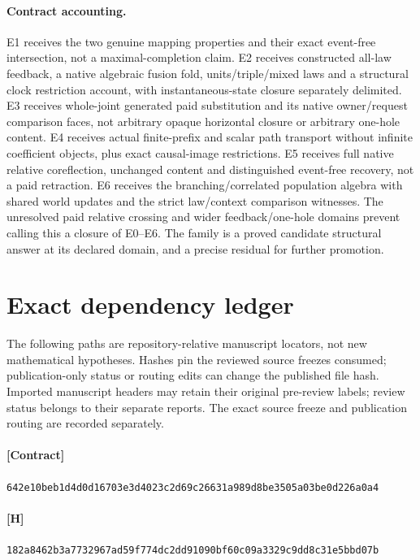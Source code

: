 \documentclass[11pt]{article}
\begin{document}
\paragraph{Contract accounting.} E1 receives the two genuine mapping properties and their exact event-free intersection, not a maximal-completion claim. E2 receives constructed all-law feedback, a native algebraic fusion fold, units/triple/mixed laws and a structural clock restriction account, with instantaneous-state closure separately delimited. E3 receives whole-joint generated paid substitution and its native owner/request comparison faces, not arbitrary opaque horizontal closure or arbitrary one-hole content. E4 receives actual finite-prefix and scalar path transport without infinite coefficient objects, plus exact causal-image restrictions. E5 receives full native relative coreflection, unchanged content and distinguished event-free recovery, not a paid retraction. E6 receives the branching/correlated population algebra with shared world updates and the strict law/context comparison witnesses. The unresolved paid relative crossing and wider feedback/one-hole domains prevent calling this a closure of E0--E6. The family is a proved candidate structural answer at its declared domain, and a precise residual for further promotion.

\section*{Exact dependency ledger}
The following paths are repository-relative manuscript locators, not new mathematical hypotheses. Hashes pin the reviewed source freezes consumed; publication-only status or routing edits can change the published file hash. Imported manuscript headers may retain their original pre-review labels; review status belongs to their separate reports. The exact source freeze and publication routing are recorded separately.
\paragraph{[Contract]} \par
{\small\texttt{642e10beb1d4d0d16703e3d4023c2d69c26631a989d8be3505a03be0d226a0a4}}
\paragraph{[H]} \par
{\small\texttt{182a8462b3a7732967ad59f774dc2dd91090bf60c09a3329c9dd8c31e5bbd07b}}
\end{document}
